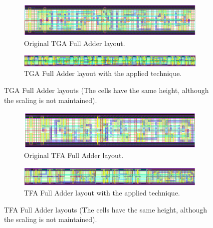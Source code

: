 \documentclass[ecp,tc, english]{iiufrgs}
\begin{document}
\begin{figure}[H]
  \centering
  \begin{subfigure}{\linewidth}
    \centering
    \includegraphics[width=\linewidth]{TGA.png}
    \caption{Original TGA Full Adder layout.}
  \end{subfigure}

  \begin{subfigure}{\linewidth}
    \centering
    \includegraphics[width=\linewidth]{TGAST.png}
    \caption{TGA Full Adder layout with the applied technique.}
  \end{subfigure}  
  \caption{TGA Full Adder layouts (The cells have the same height, although the scaling is not maintained).}
  \label{TGA}
\end{figure}

\begin{figure}[H]
  \centering
  \begin{subfigure}{\linewidth}
    \centering
    \includegraphics[width=\linewidth]{TFA.png}
    \caption{Original TFA Full Adder layout.}
  \end{subfigure}

  \begin{subfigure}{\linewidth}
    \centering
    \includegraphics[width=\linewidth]{TFAST.png}
    \caption{TFA Full Adder layout with the applied technique.}
  \end{subfigure}  
  \caption{TFA Full Adder layouts (The cells have the same height, although the scaling is not maintained).}
  \label{TFA}
\end{figure}
\end{document}
